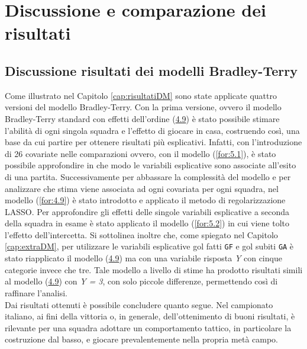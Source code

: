 \chapter{Discussione e comparazione dei risultati}
\label{cap:precls}
\section{Discussione risultati dei modelli Bradley-Terry}
Come illustrato nel Capitolo \ref{cap:risultatiDM} sono state applicate quattro versioni del modello Bradley-Terry. Con la prima versione, ovvero il modello Bradley-Terry standard con effetti dell'ordine (\hyperref[for:3.9]{4.9}) \autocite{bradley1952rank} è stato possibile stimare l'abilità di ogni singola squadra e l'effetto di giocare in casa, costruendo così, una base da cui partire per ottenere risultati più esplicativi. Infatti, con l'introduzione di 26 covariate nelle comparazioni ovvero, con il modello (\ref{for:5.1}), è stato possibile approfondire in che modo le variabili esplicative sono associate all'esito di una partita. Successivamente per abbassare la complessità del modello e per analizzare che stima viene associata ad ogni covariata per ogni squadra, nel modello (\ref{for:4.9}) è stato introdotto e applicato il metodo di regolarizzazione LASSO. Per approfondire gli effetti delle singole variabili esplicative a seconda della squadra in esame è stato applicato il modello (\ref{for:5.2}) in cui viene tolto l'effetto dell'intercetta. Si sottolinea inoltre che, come spiegato nel Capitolo \ref{cap:extraDM}, per utilizzare le variabili esplicative gol fatti \texttt{GF} e gol subiti \texttt{GA} è stato riapplicato il modello (\hyperref[for:3.9]{4.9}) ma con una variabile risposta \emph{Y} con cinque categorie invece che tre. Tale modello a livello di stime ha prodotto risultati simili al modello (\hyperref[for:3.9]{4.9}) con \emph{Y = 3}, con solo piccole differenze, permettendo così di raffinare l'analisi.\\
Dai risultati ottenuti è possibile concludere quanto segue. Nel campionato italiano, ai fini della vittoria o, in generale, dell'ottenimento di buoni risultati, è rilevante per una squadra adottare un comportamento tattico, in particolare la costruzione dal basso, e giocare prevalentemente nella propria metà campo. 
